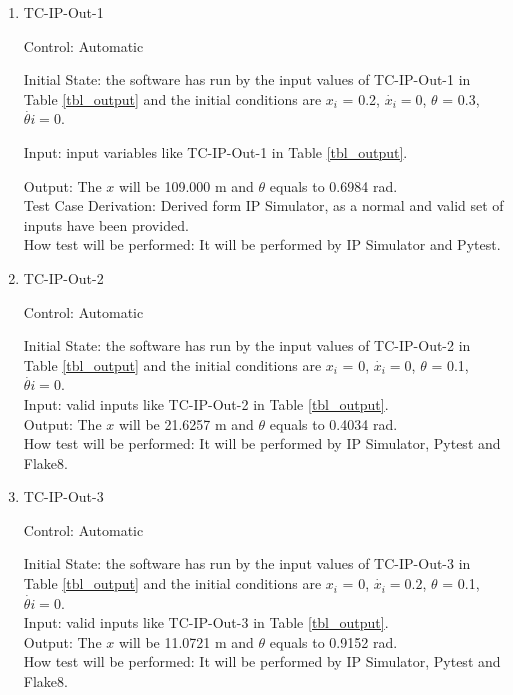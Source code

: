 \documentclass[12pt, titlepage]{article}
\begin{document}
\begin{enumerate}

\item{TC-IP-Out-1}

Control: Automatic
					
Initial State: the software has run by the input values of TC-IP-Out-1 in Table \ref{tbl_output} and the initial conditions are $x_i$ = 0.2, $\dot{x_i} = 0$, $\theta$ = 0.3, $\dot{\theta{i}}=0$.
					
Input: input variables like TC-IP-Out-1 in Table \ref{tbl_output}.
					
Output: The $x$ will be 109.000  \si{\metre} and $\theta$ equals to 0.6984 \si{\radian}.\\
Test Case Derivation: Derived form IP Simulator, as a normal and valid set of inputs have been provided.\\					
How test will be performed: It will be performed by IP Simulator and Pytest.\\

\item{TC-IP-Out-2}

Control: Automatic
					
Initial State: the software has run by the input values of TC-IP-Out-2 in Table \ref{tbl_output} and the initial conditions are $x_i$ = 0, $\dot{x_i} = 0$, $\theta$ = 0.1, $\dot{\theta{i}}=0$.\\
Input: valid inputs like TC-IP-Out-2 in Table \ref{tbl_output}.\\	
Output: The $x$ will be 21.6257  \si{\metre} and $\theta$ equals to 0.4034 \si{\radian}.\\
How test will be performed:  It will be performed by IP Simulator, Pytest and Flake8.\\


\item{TC-IP-Out-3}

Control: Automatic
					
Initial State: the software has run by the input values of TC-IP-Out-3 in Table \ref{tbl_output} and the initial conditions are $x_i$ = 0, $\dot{x_i} = 0.2$, $\theta$ = 0.1, $\dot{\theta{i}}=0$.\\				
Input: valid inputs like TC-IP-Out-3 in Table \ref{tbl_output}.\\	
Output: The $x$ will be 11.0721 \si{\metre} and $\theta$ equals to 0.9152 \si{\radian}.\\
How test will be performed: It will be performed by IP Simulator, Pytest and Flake8.\\



\end{enumerate}
\end{document}
